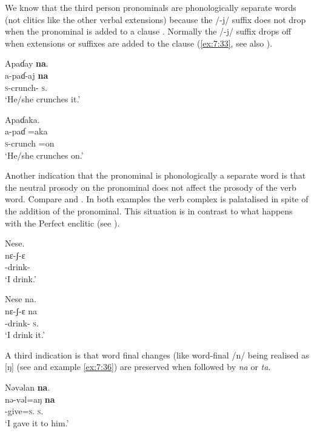 We know that the third person \DO pronominals are phonologically separate words (not clitics like the other verbal extensions) because the /-j/ suffix does not drop when the \DO pronominal is added to a clause .  Normally the /-j/ suffix drops off when extensions or suffixes are added to the clause (\ref{ex:7:33}, see also ). 

\ea\label{ex:7:32}
Apaɗay  \textbf{na}.   \\   
\gll a-paɗ-aj     \textbf{na} \\     
\textsc{s}-crunch{}-{\CL}   \textsc{s}.{\DO}\\
\glt ‘He/she crunches it.’ 
\z

\ea\label{ex:7:33}
Apaɗaka.\\
\gll a-paɗ  =aka\\
\textsc{s}-crunch  =on\\
\glt ‘He/she crunches on.’ 
\z

Another indication that the \DO pronominal is phonologically a separate word is that the neutral prosody on the \DO pronominal does not affect the prosody of the verb word. Compare  and . In both examples the verb complex is palatalised in spite of the addition of the \DO pronominal. This situation is in contrast to what happens with the Perfect enclitic (see ). 

\ea\label{ex:7:34}
Nese.\\
\gll nɛ-ʃ{}-ɛ\\
{\oneS}-drink{}-{\CL}\\
\glt ‘I drink.’
\z

\ea\label{ex:7:35}
Nese  na.\\
\gll nɛ-ʃ{}-ɛ  na\\
{\oneS}-drink{}-{\CL}  \textsc{s}.{\DO}\\
\glt ‘I drink it.’ 
\z

A third indication is that word final changes (like word-final /n/ being realised as [ŋ] (see  and example \ref{ex:7:36}) are preserved when followed by \textit{na} or \textit{ta}.

\ea\label{ex:7:36}
Nəvəlan  \textbf{na}. \\
\gll nə-vəl=aŋ     \textbf{na} \\
{\oneS}-give=\textsc{s}.{\IO}   \textsc{s}.{\DO}\\
\glt ‘I gave it to him.’
\z


